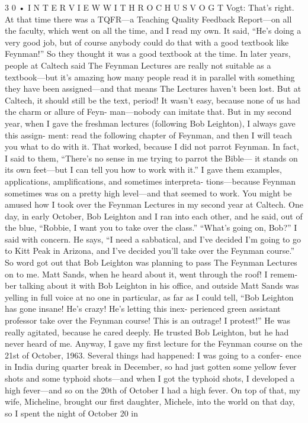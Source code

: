 \documentclass[10pt,oneside]{article}
\begin{document}
3 0 • I N T E R V I E W  W I T H  R O C H U S  V O G T Vogt: That’s right. At that time there was a TQFR---a Teaching Quality Feedback Report---on all the faculty, which went on all the time, and I read my own. It said, “He’s doing a very good job, but of course anybody could do that with a good textbook like Feynman!” So they thought it was a good textbook at the time. In later years, people at Caltech said The Feynman Lectures are really not suitable as a textbook---but it’s amazing how many people read it in parallel with something they have been assigned---and that means The Lectures haven’t been lost. But at Caltech, it should still be the text, period! It wasn’t easy, because none of us had the charm or allure of Feyn- man---nobody can imitate that. But in my second year, when I gave the freshman lectures (following Bob Leighton), I always gave this assign- ment: read the following chapter of Feynman, and then I will teach you what to do with it. That worked, because I did not parrot Feynman. In fact, I said to them, “There’s no sense in me trying to parrot the Bible--- it stands on its own feet---but I can tell you how to work with it.” I gave them examples, applications, amplifications, and sometimes interpreta- tions---because Feynman sometimes was on a pretty high level---and that seemed to work. You might be amused how I took over the Feynman Lectures in my second year at Caltech. One day, in early October, Bob Leighton and I ran into each other, and he said, out of the blue, “Robbie, I want you to take over the class.” “What’s going on, Bob?” I said with concern. He says, “I need a sabbatical, and I’ve decided I’m going to go to Kitt Peak in Arizona, and I’ve decided you’ll take over the Feynman course.” So word got out that Bob Leighton was planning to pass The Feynman Lectures on to me. Matt Sands, when he heard about it, went through the roof! I remem- ber talking about it with Bob Leighton in his office, and outside Matt Sands was yelling in full voice at no one in particular, as far as I could tell, “Bob Leighton has gone insane! He’s crazy! He’s letting this inex- perienced green assistant professor take over the Feynman course! This is an outrage! I protest!” He was really agitated, because he cared deeply. He trusted Bob Leighton, but he had never heard of me. Anyway, I gave my first lecture for the Feynman course on the 21st of October, 1963. Several things had happened: I was going to a confer- ence in India during quarter break in December, so had just gotten some yellow fever shots and some typhoid shots---and when I got the typhoid shots, I developed a high fever---and so on the 20th of October I had a high fever. On top of that, my wife, Micheline, brought our first daughter, Michele, into the world on that day, so I spent the night of October 20 in\par
\end{document}
